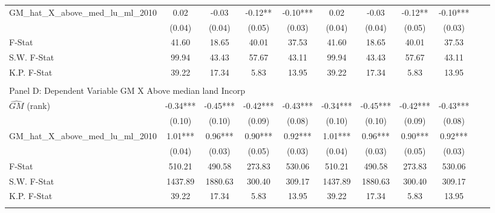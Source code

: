 \begin{table}[htbp]
\begin{threeparttable}
\begin{tabular}{l*{10}{c}}
\addlinespace
GM\_hat\_X\_above\_med\_lu\_ml\_2010&       0.02   &      -0.03   &      -0.12** &      -0.10***&       0.02   &      -0.03   &      -0.12** &      -0.10***\\
                &     (0.04)   &     (0.04)   &     (0.05)   &     (0.03)   &     (0.04)   &     (0.04)   &     (0.05)   &     (0.03)   \\
\midrule
F-Stat          &      41.60   &      18.65   &      40.01   &      37.53   &      41.60   &      18.65   &      40.01   &      37.53   \\
S.W. F-Stat     &      99.94   &      43.43   &      57.67   &      43.11   &      99.94   &      43.43   &      57.67   &      43.11   \\
K.P. F-Stat     &      39.22   &      17.34   &       5.83   &      13.95   &      39.22   &      17.34   &       5.83   &      13.95   \\
\cmidrule[\heavyrulewidth](lr){1-9} \\ \cmidrule[\heavyrulewidth](lr){1-9}
\multicolumn{8}{l}{Panel D: Dependent Variable GM X Above median land Incorp}\\
\cmidrule(lr){1-9}
$\hat{GM}$ (rank)&      -0.34***&      -0.45***&      -0.42***&      -0.43***&      -0.34***&      -0.45***&      -0.42***&      -0.43***\\
                &     (0.10)   &     (0.10)   &     (0.09)   &     (0.08)   &     (0.10)   &     (0.10)   &     (0.09)   &     (0.08)   \\
\addlinespace
GM\_hat\_X\_above\_med\_lu\_ml\_2010&       1.01***&       0.96***&       0.90***&       0.92***&       1.01***&       0.96***&       0.90***&       0.92***\\
                &     (0.04)   &     (0.03)   &     (0.05)   &     (0.03)   &     (0.04)   &     (0.03)   &     (0.05)   &     (0.03)   \\
\midrule
F-Stat          &     510.21   &     490.58   &     273.83   &     530.06   &     510.21   &     490.58   &     273.83   &     530.06   \\
S.W. F-Stat     &    1437.89   &    1880.63   &     300.40   &     309.17   &    1437.89   &    1880.63   &     300.40   &     309.17   \\
K.P. F-Stat     &      39.22   &      17.34   &       5.83   &      13.95   &      39.22   &      17.34   &       5.83   &      13.95   \\
\cmidrule[\heavyrulewidth](lr){1-9} \\ \cmidrule[\heavyrulewidth](lr){1-9}

\end{tabular}
\end{threeparttable}
\end{table}
